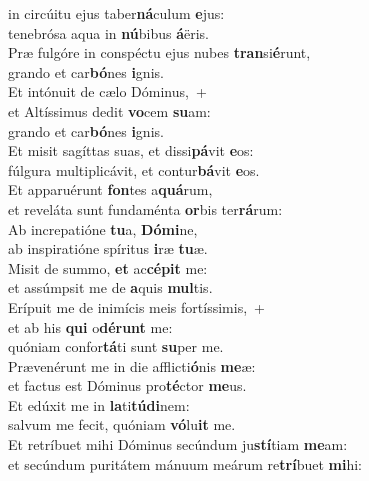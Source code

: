 \oddverse  in circúitu ejus taber\textbf{ná}culum \textbf{e}jus:~\*\\
\oddverse tenebrósa aqua in \textbf{nú}bibus \textbf{á}ëris.\\
\evenverse Præ fulgóre in conspéctu ejus nubes \textbf{tran}si\textbf{é}runt,~\*\\
\evenverse grando et car\textbf{bó}nes \textbf{i}gnis.\\
\oddverse Et intónuit de cælo Dóminus,~+\\
\oddverse  et Altíssimus dedit \textbf{vo}cem \textbf{su}am:~\*\\
\oddverse grando et car\textbf{bó}nes \textbf{i}gnis.\\
\evenverse Et misit sagíttas suas, et dissi\textbf{pá}vit \textbf{e}os:~\*\\
\evenverse fúlgura multiplicávit, et contur\textbf{bá}vit \textbf{e}os.\\
\oddverse Et apparuérunt \textbf{fon}tes a\textbf{quá}rum,~\*\\
\oddverse et reveláta sunt fundaménta \textbf{or}bis ter\textbf{rá}rum:\\
\evenverse Ab increpatióne \textbf{tu}a, \textbf{Dó}\textbf{mi}ne,~\*\\
\evenverse ab inspiratióne spíritus \textbf{i}ræ \textbf{tu}æ.\\
\oddverse Misit de summo, \textbf{et} ac\textbf{cé}\textbf{pit} me:~\*\\
\oddverse et assúmpsit me de \textbf{a}quis \textbf{mul}tis.\\
\evenverse Erípuit me de inimícis meis fortíssimis,~+\\
\evenverse  et ab his \textbf{qui} o\textbf{dé}\textbf{runt} me:~\*\\
\evenverse quóniam confor\textbf{tá}ti sunt \textbf{su}per me.\\
\oddverse Prævenérunt me in die afflicti\textbf{ó}nis \textbf{me}æ:~\*\\
\oddverse et factus est Dóminus pro\textbf{té}ctor \textbf{me}us.\\
\evenverse Et edúxit me in \textbf{la}ti\textbf{tú}\textbf{di}nem:~\*\\
\evenverse salvum me fecit, quóniam \textbf{vó}lu\textbf{it} me.\\
\oddverse Et retríbuet mihi Dóminus secúndum ju\textbf{stí}tiam \textbf{me}am:~\*\\
\oddverse et secúndum puritátem mánuum meárum re\textbf{trí}buet \textbf{mi}hi:\\
